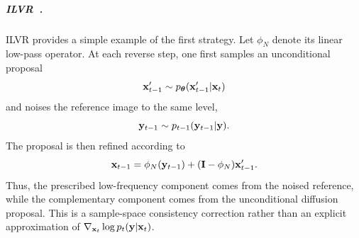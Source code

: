\subparagraph{ILVR~\citep{choi2021ilvr}.}
ILVR provides a simple example of the first strategy. Let $\phi_N$ denote its
linear low-pass operator. At each reverse step, one first samples an
unconditional proposal
\[
{\mathbf{x}}_{t-1}'
\sim
p_{\bm\theta}({\mathbf{x}}_{t-1}'|{\mathbf{x}}_t)
\]
and noises the reference image to the same level,
\[
{\mathbf{y}}_{t-1}
\sim
p_{t-1}({\mathbf{y}}_{t-1}|{\mathbf{y}}).
\]
The proposal is then refined according to
\[
{\mathbf{x}}_{t-1}
=
\phi_N({\mathbf{y}}_{t-1})
+
({\mathbf{I}}-\phi_N){\mathbf{x}}_{t-1}'.
\]
Thus, the prescribed low-frequency component comes from the noised reference,
while the complementary component comes from the unconditional diffusion
proposal. This is a sample-space consistency correction rather than an
explicit approximation of
$\nabla_{{\mathbf{x}}_t}\log p_t({\mathbf{y}}|{\mathbf{x}}_t)$.





